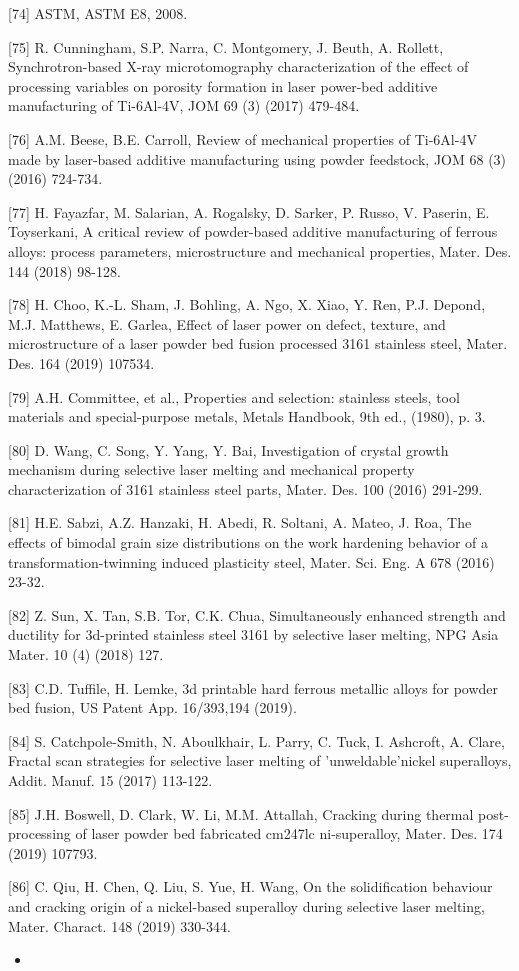 \documentclass[10pt]{article}
\begin{document}
[74] ASTM, ASTM E8, 2008.

[75] R. Cunningham, S.P. Narra, C. Montgomery, J. Beuth, A. Rollett, Synchrotron-based X-ray microtomography characterization of the effect of processing variables on porosity formation in laser power-bed additive manufacturing of Ti-6Al-4V, JOM 69 (3) (2017) 479-484.

[76] A.M. Beese, B.E. Carroll, Review of mechanical properties of Ti-6Al-4V made by laser-based additive manufacturing using powder feedstock, JOM 68 (3) (2016) 724-734.

[77] H. Fayazfar, M. Salarian, A. Rogalsky, D. Sarker, P. Russo, V. Paserin, E. Toyserkani, A critical review of powder-based additive manufacturing of ferrous alloys: process parameters, microstructure and mechanical properties, Mater. Des. 144 (2018) 98-128.

[78] H. Choo, K.-L. Sham, J. Bohling, A. Ngo, X. Xiao, Y. Ren, P.J. Depond, M.J. Matthews, E. Garlea, Effect of laser power on defect, texture, and microstructure of a laser powder bed fusion processed 3161 stainless steel, Mater. Des. 164 (2019) 107534.

[79] A.H. Committee, et al., Properties and selection: stainless steels, tool materials and special-purpose metals, Metals Handbook, 9th ed., (1980), p. 3.

[80] D. Wang, C. Song, Y. Yang, Y. Bai, Investigation of crystal growth mechanism during selective laser melting and mechanical property characterization of 3161 stainless steel parts, Mater. Des. 100 (2016) 291-299.

[81] H.E. Sabzi, A.Z. Hanzaki, H. Abedi, R. Soltani, A. Mateo, J. Roa, The effects of bimodal grain size distributions on the work hardening behavior of a transformation-twinning induced plasticity steel, Mater. Sci. Eng. A 678 (2016) 23-32.

[82] Z. Sun, X. Tan, S.B. Tor, C.K. Chua, Simultaneously enhanced strength and ductility for 3d-printed stainless steel 3161 by selective laser melting, NPG Asia Mater. 10 (4) (2018) 127.

[83] C.D. Tuffile, H. Lemke, 3d printable hard ferrous metallic alloys for powder bed fusion, US Patent App. 16/393,194 (2019).

[84] S. Catchpole-Smith, N. Aboulkhair, L. Parry, C. Tuck, I. Ashcroft, A. Clare, Fractal scan strategies for selective laser melting of 'unweldable'nickel superalloys, Addit. Manuf. 15 (2017) 113-122.

[85] J.H. Boswell, D. Clark, W. Li, M.M. Attallah, Cracking during thermal post-processing of laser powder bed fabricated cm247lc ni-superalloy, Mater. Des. 174 (2019) 107793.

[86] C. Qiu, H. Chen, Q. Liu, S. Yue, H. Wang, On the solidification behaviour and cracking origin of a nickel-based superalloy during selective laser melting, Mater. Charact. 148 (2019) 330-344.

\begin{itemize}
  \item 
\end{itemize}
\end{document}
